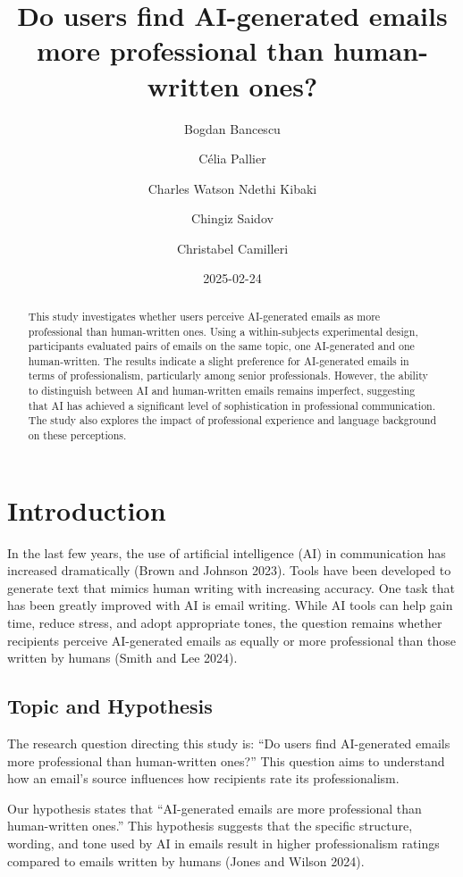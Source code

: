 \documentclass[
]{article}
\title{Do users find AI-generated emails more professional than
human-written ones?}
\author{Bogdan Bancescu \and Célia Pallier \and Charles Watson Ndethi
Kibaki \and Chingiz Saidov \and Christabel Camilleri}
\date{2025-02-24}
\begin{document}
\maketitle
\begin{abstract}
This study investigates whether users perceive AI-generated emails as
more professional than human-written ones. Using a within-subjects
experimental design, participants evaluated pairs of emails on the same
topic, one AI-generated and one human-written. The results indicate a
slight preference for AI-generated emails in terms of professionalism,
particularly among senior professionals. However, the ability to
distinguish between AI and human-written emails remains imperfect,
suggesting that AI has achieved a significant level of sophistication in
professional communication. The study also explores the impact of
professional experience and language background on these perceptions.
\end{abstract}


\section{Introduction}\label{introduction}

In the last few years, the use of artificial intelligence (AI) in
communication has increased dramatically (Brown and Johnson 2023). Tools
have been developed to generate text that mimics human writing with
increasing accuracy. One task that has been greatly improved with AI is
email writing. While AI tools can help gain time, reduce stress, and
adopt appropriate tones, the question remains whether recipients
perceive AI-generated emails as equally or more professional than those
written by humans (Smith and Lee 2024).

\subsection{Topic and Hypothesis}\label{topic-and-hypothesis}

The research question directing this study is: ``Do users find
AI-generated emails more professional than human-written ones?'' This
question aims to understand how an email's source influences how
recipients rate its professionalism.

Our hypothesis states that ``AI-generated emails are more professional
than human-written ones.'' This hypothesis suggests that the specific
structure, wording, and tone used by AI in emails result in higher
professionalism ratings compared to emails written by humans (Jones and
Wilson 2024).
\end{document}
